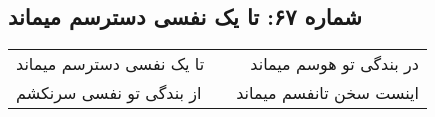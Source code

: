 \begin{center}
\section*{شماره ۶۷: تا یک نفسی دسترسم میماند}
\label{sec:067}
\begin{longtable}{l p{0.5cm} r}
تا یک نفسی دسترسم میماند
&&
در بندگی تو هوسم میماند
\\
از بندگی تو نفسی سرنکشم
&&
اینست سخن تانفسم میماند
\\
\end{longtable}
\end{center}
